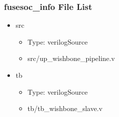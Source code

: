 \subsubsection{fusesoc\_info File List}
\begin{itemize}
\item src
	\begin{itemize}
	\item[$\space$] Type: verilogSource
	\item src/up\_wishbone\_pipeline.v
	\end{itemize}
\item tb
	\begin{itemize}
	\item[$\space$] Type: verilogSource
	\item tb/tb\_wishbone\_slave.v
	\end{itemize}
\end{itemize}
